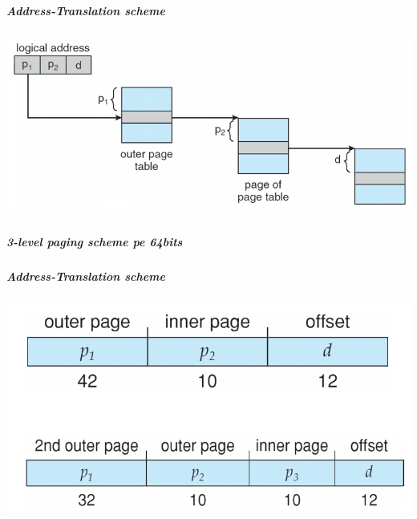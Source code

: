 \documentclass{article}
\begin{document}
\subparagraph*{Address-Translation scheme}
\begin{center}
    \includegraphics[scale=0.3]{23-ats.png}
\end{center}

\subparagraph*{3-level paging scheme pe 64bits}
\subparagraph*{Address-Translation scheme}
\begin{center}
    \includegraphics[scale=0.3]{24-tps.png}
\end{center}
\end{document}
